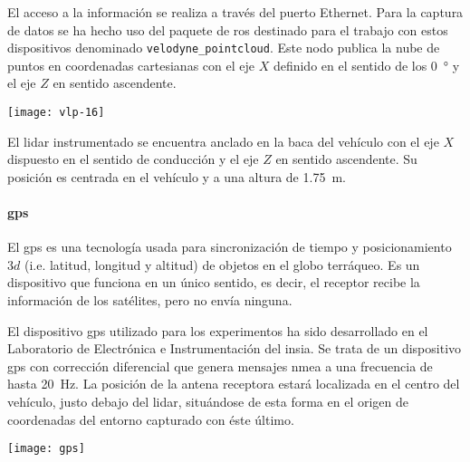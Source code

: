 El acceso a la información se realiza a través del puerto Ethernet. Para la captura de datos se ha hecho uso del paquete de \ac{ros} destinado para el trabajo con estos dispositivos denominado \texttt{velodyne\_pointcloud}. Este nodo publica la nube de puntos en coordenadas cartesianas con el eje $X$ definido en el sentido de los \SI{0}{\degree} y el eje $Z$ en sentido ascendente.

\begin{marginfigure}
	\texttt{[image: vlp-16]}
	\caption[\acrshort{lidar} modelo VLP-$16$ de empresa Velodyne]{El \acrshort{lidar} VLP-16 de Velodyne tiene un FOV horizontal de \SI{360}{\degree} y vertical de \SI{\pm15}{\degree}, permitiendo una captura de todo el entorno circundante a una frecuencia de hasta \SI{20}{\Hz}. Fuente: \url{http://velodynelidar.com/vlp-16.html}.}
	\label{fig:vlp-16}
\end{marginfigure}

El \ac{lidar} instrumentado se encuentra anclado en la baca del vehículo con el eje $X$ dispuesto en el sentido de conducción y el eje $Z$ en sentido ascendente. Su posición es centrada en el vehículo y a una altura de \SI{1.75}{\meter}.

\paragraph{\ac{gps}}

El \ac{gps} es una tecnología usada para sincronización de tiempo y posicionamiento $3d$ (i.e. latitud, longitud y altitud) de objetos en el globo terráqueo. Es un dispositivo que funciona en un único sentido, es decir, el receptor recibe la información de los satélites, pero no envía ninguna.

El dispositivo \ac{gps} utilizado para los experimentos ha sido desarrollado en el Laboratorio de Electrónica e Instrumentación del \ac{insia}. Se trata de un dispositivo \ac{gps} con corrección diferencial que genera mensajes \ac{nmea} a una frecuencia de hasta \SI{20}{\Hz}. La posición de la antena receptora estará localizada en el centro del vehículo, justo debajo del \ac{lidar}, situándose de esta forma en el origen de coordenadas del entorno capturado con éste último.

\begin{marginfigure}
	\centering
	\texttt{[image: gps]}
	\caption[Posicionamiento \gls{gps} sobre la tierra]{El \ac{gps} permite el posicionamiento 3d sobre en la tierra gracias a la comunicación unidireccional de satélites situados en órbita. Fuente: Wikimedia Commons.}
	\label{fig:gps}
\end{marginfigure}

